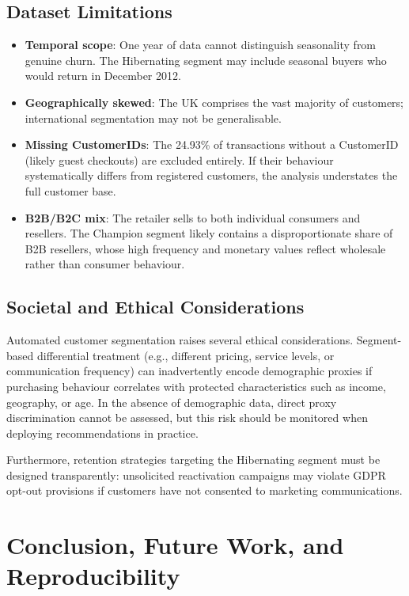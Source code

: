 \documentclass[10pt,a4paper]{article}
\begin{document}
\subsection{Dataset Limitations}

\begin{itemize}[leftmargin=*]
  \item \textbf{Temporal scope}: One year of data cannot distinguish seasonality from
        genuine churn.  The Hibernating segment may include seasonal buyers who would
        return in December 2012.
  \item \textbf{Geographically skewed}: The UK comprises the vast majority of customers;
        international segmentation may not be generalisable.
  \item \textbf{Missing CustomerIDs}: The 24.93\% of transactions without a CustomerID
        (likely guest checkouts) are excluded entirely.  If their behaviour systematically
        differs from registered customers, the analysis understates the full customer base.
  \item \textbf{B2B/B2C mix}: The retailer sells to both individual consumers and resellers.
        The Champion segment likely contains a disproportionate share of B2B resellers,
        whose high frequency and monetary values reflect wholesale rather than consumer behaviour.
\end{itemize}

\subsection{Societal and Ethical Considerations}

Automated customer segmentation raises several ethical considerations.  Segment-based
differential treatment (e.g., different pricing, service levels, or communication
frequency) can inadvertently encode demographic proxies if purchasing behaviour
correlates with protected characteristics such as income, geography, or age.
In the absence of demographic data, direct proxy discrimination cannot be assessed,
but this risk should be monitored when deploying recommendations in practice.

Furthermore, retention strategies targeting the Hibernating segment must be designed
transparently: unsolicited reactivation campaigns may violate GDPR opt-out provisions
if customers have not consented to marketing communications.

\section{Conclusion, Future Work, and Reproducibility}
\end{document}
